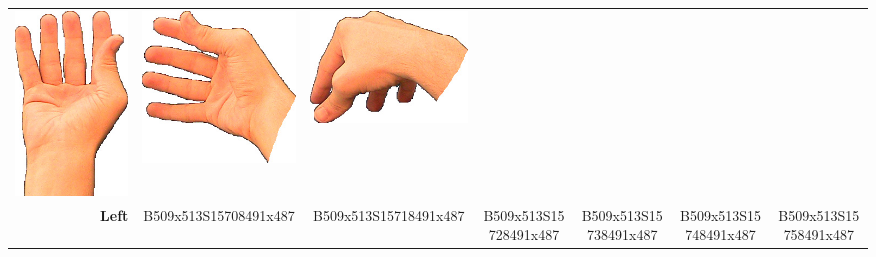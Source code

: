 \documentclass{article}
\begin{document}
\begin{center}
\begin{tabular}{r*{6}{c}}
\includegraphics[scale=0.1]{images/05-09-4.jpg}&
\includegraphics[scale=0.1]{images/05-09-5.jpg}&
\includegraphics[scale=0.1]{images/05-09-6.jpg}\\
\textbf{Left}&
B509x513S15708491x487&
B509x513S15718491x487&
B509x513S15728491x487&
B509x513S15738491x487&
B509x513S15748491x487&
B509x513S15758491x487\\
\end{tabular}
\end{center}
\end{document}
